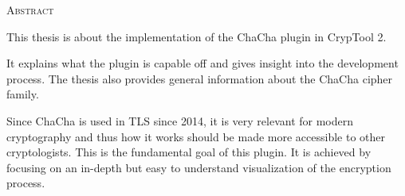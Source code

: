 \begin{center}
  \textsc{Abstract}
\end{center}

\noindent
This thesis is about the implementation of the ChaCha plugin in CrypTool 2.

\medskip
\noindent
It explains what the plugin is capable off and gives insight into the development process. The thesis also provides general information about the ChaCha cipher family.

\medskip
\noindent
Since ChaCha is used in TLS since 2014, it is very relevant for modern cryptography and thus how it works should be made more accessible to other cryptologists. This is the fundamental goal of this plugin. It is achieved by focusing on an in-depth but easy to understand visualization of  the encryption process.

